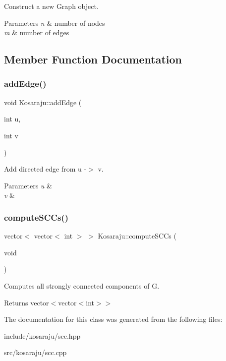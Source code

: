 Construct a new Graph object. 


\begin{DoxyParams}{Parameters}
{\em n} & number of nodes \\
\hline
{\em m} & number of edges \\
\hline
\end{DoxyParams}


\subsection{Member Function Documentation}
\mbox{\label{classKosaraju_a5823c2fbedc3a02653c78277138b9d55}} 
\subsubsection{\texorpdfstring{add\+Edge()}{addEdge()}}
{\footnotesize\ttfamily void Kosaraju\+::add\+Edge (\begin{DoxyParamCaption}\item[{int}]{u,  }\item[{int}]{v }\end{DoxyParamCaption})}



Add directed edge from u -\/$>$ v. 


\begin{DoxyParams}{Parameters}
{\em u} & \\
\hline
{\em v} & \\
\hline
\end{DoxyParams}
\mbox{\label{classKosaraju_ae283595a4b00f90229ebb6a2f8a66f61}} 
\subsubsection{\texorpdfstring{compute\+S\+C\+Cs()}{computeSCCs()}}
{\footnotesize\ttfamily vector$<$ vector$<$ int $>$ $>$ Kosaraju\+::compute\+S\+C\+Cs (\begin{DoxyParamCaption}\item[{void}]{ }\end{DoxyParamCaption})}



Computes all strongly connected components of G. 

\begin{DoxyReturn}{Returns}
vector$<$vector$<$int$>$$>$ 
\end{DoxyReturn}


The documentation for this class was generated from the following files\+:\begin{DoxyCompactItemize}
\item 
include/kosaraju/scc.\+hpp\item 
src/kosaraju/scc.\+cpp\end{DoxyCompactItemize}

